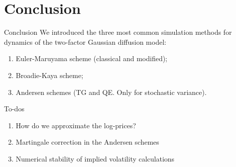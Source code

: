 \documentclass[aspectratio=169]{beamer}
\begin{document}
    \section{Conclusion}
        \begin{frame}{Conclusion}
            We introduced the three most common simulation methods for dynamics of the two-factor Gaussian diffusion model:
            \begin{enumerate}
                \item Euler-Maruyama scheme (classical and modified); 
                \item Broadie-Kaya scheme;
                \item Andersen schemes (TG and QE. Only for stochastic variance).
            \end{enumerate}
        \end{frame}
        \begin{frame}{To-dos}
            \begin{enumerate}
                \item How do we approximate the log-prices?
                \item Martingale correction in the Andersen schemes
                \item Numerical stability of implied volatility calculations
            \end{enumerate}
        \end{frame}
\end{document}
